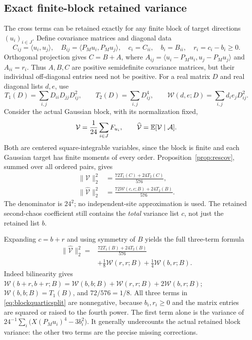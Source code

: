 \documentclass[11pt]{article}
\begin{document}
\subsection*{Exact finite-block retained variance}
The cross terms can be retained exactly for any finite block of target
directions $(u_i)_{i\in J}$. Define covariance matrices and diagonal data
\[
 C_{ij}=\langle u_i,u_j\rangle,\quad
 B_{ij}=\langle P_Mu_i,P_Mu_j\rangle,\quad
 c_i=C_{ii},\quad b_i=B_{ii},\quad r_i=c_i-b_i\geq0.
\]
Orthogonal projection gives $C=B+A$, where
$A_{ij}=\langle u_i-P_Mu_i,u_j-P_Mu_j\rangle$ and $A_{ii}=r_i$.
Thus $A,B,C$ are positive semidefinite covariance matrices, but their
individual off-diagonal entries need not be positive.
For a real matrix $D$ and real diagonal lists $d,e$, use
\[
 T_1(D)=\sum_{i,j}D_{ii}D_{jj}D_{ij}^2,\qquad
 T_2(D)=\sum_{i,j}D_{ij}^4,\qquad
 \mathcal W(d,e;D)=\sum_{i,j}d_ie_jD_{ij}^2.
\]
Consider the actual Gaussian block, with its normalization fixed,
\[
 \mathcal V=\frac1{24}\sum_{i\in J}F_{u_i},
 \qquad \widehat{\mathcal V}=\mathbb E[\mathcal V\mid\mathcal A].
\]
Both are centered square-integrable variables, since the block is finite
and each Gaussian target has finite moments of every order.
Proposition~\ref{prop:rescov}, summed over all ordered pairs, gives
\begin{align}\label{eq:blockquartic}
 \|\mathcal V\|_2^2
 &=\frac{72T_1(C)+24T_2(C)}{576},\\
 \|\widehat{\mathcal V}\|_2^2
 &=\frac{72\mathcal W(c,c;B)+24T_2(B)}{576}.\nonumber
\end{align}
The denominator is $24^2$; no independent-site approximation is used.
The retained second-chaos coefficient still contains the \emph{total}
variance list $c$, not just the retained list $b$.

Expanding $c=b+r$ and using symmetry of $B$ yields the full three-term
formula
\begin{align}\label{eq:blockquarticsplit}
 \|\widehat{\mathcal V}\|_2^2
 ={}&\frac{72T_1(B)+24T_2(B)}{576}\\
 &+\frac18\mathcal W(r,r;B)
   +\frac14\mathcal W(b,r;B).\nonumber
\end{align}
Indeed bilinearity gives
$\mathcal W(b+r,b+r;B)=\mathcal W(b,b;B)
+\mathcal W(r,r;B)+2\mathcal W(b,r;B)$;
$\mathcal W(b,b;B)=T_1(B)$, and $72/576=1/8$.
All three terms in \eqref{eq:blockquarticsplit} are nonnegative,
because $b_i,r_i\geq0$ and the matrix entries are squared or raised
to the fourth power. The first term alone is the variance of
$24^{-1}\sum_i\big(X(P_Mu_i)^4-3b_i^2\big)$.
It generally undercounts the actual retained block variance: the other
two terms are the precise missing corrections.
\end{document}
